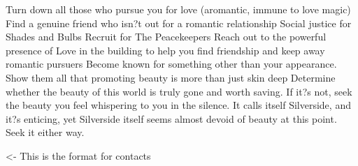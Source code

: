 \documentclass[char]{Silversiders}
\begin{document}
\name{\cBeauty{}}

Turn down all those who pursue you for love (aromantic, immune to love magic)
Find a genuine friend who isn?t out for a romantic relationship
Social justice for Shades and Bulbs
Recruit for The Peacekeepers
Reach out to the powerful presence of Love in the building to help you find friendship and keep away romantic pursuers
Become known for something other than your appearance. Show them all that promoting beauty is more than just skin deep
Determine whether the beauty of this world is truly gone and worth saving. 
If it?s not, seek the beauty you feel whispering to you in the silence. It calls itself Silverside, and it?s enticing, yet Silverside itself seems almost devoid of beauty at this point. Seek it either way.

\begin{itemz}[Goals]
	\item 
\end{itemz}

\begin{itemz}[Notes]
	\item 
\end{itemz}

\begin{contacts}
	\contact{\cTest{}} <- This is the format for contacts 
\end{contacts}
\end{document}
